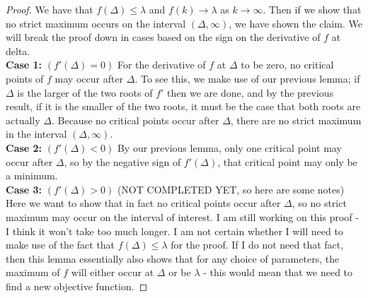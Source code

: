 \documentclass{article}
\begin{document}
\begin{proof}
We have that $f(\Delta) \leq \lambda$ and $f(k) \rightarrow \lambda$ as $k \rightarrow \infty$. Then if we show that no strict maximum occurs on the interval $(\Delta, \infty)$, we have shown the claim. We will break the proof down in cases based on the sign on the derivative of $f$ at delta. \\

\textbf{Case 1:} $(f'(\Delta) = 0)$ For the derivative of $f$ at $\Delta$ to be zero, no critical points of $f$ may occur after $\Delta$. To see this, we make use of our previous lemma; if $\Delta$ is the larger of the two roots of $f'$ then we are done, and by the previous result, if it is the smaller of the two roots, it must be the case that both roots are actually $\Delta$. Because no critical points occur after $\Delta$, there are no strict maximum in the interval $(\Delta, \infty)$. \\

\textbf{Case 2:} $(f'(\Delta) < 0)$ By our previous lemma, only one critical point may occur after $\Delta$, so by the negative sign of $f'(\Delta)$, that critical point may only be a minimum. \\

\textbf{Case 3:} $(f'(\Delta) > 0)$ (NOT COMPLETED YET, so here are some notes) Here we want to show that in fact no critical points occur after $\Delta$, so no strict maximum may occur on the interval of interest. I am still working on this proof - I think it won't take too much longer. I am not certain whether I will need to make use of the fact that $f(\Delta) \leq \lambda$ for the proof. If I do not need that fact, then this lemma essentially also shows that for any choice of parameters, the maximum of $f$ will either occur at $\Delta$ or be $\lambda$ - this would mean that we need to find a new objective function.
\end{proof}
\end{document}
